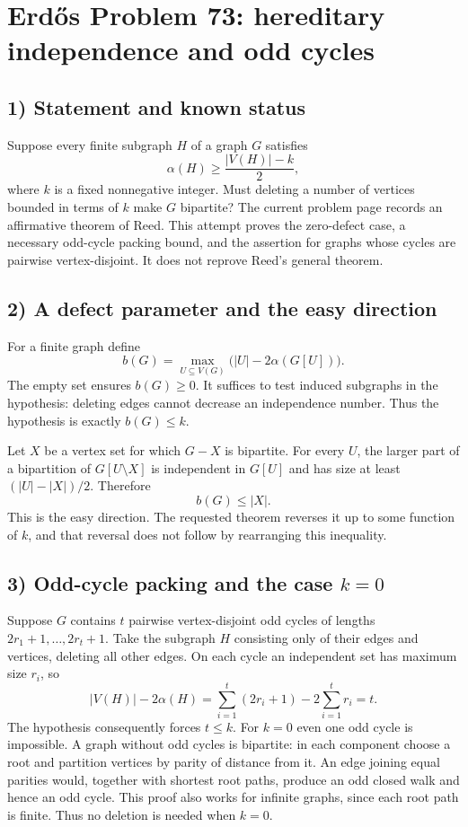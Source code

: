 \section{Erd\H{o}s Problem 73: hereditary independence and odd cycles}

\subsection{1) Statement and known status}
Suppose every finite subgraph $H$ of a graph $G$ satisfies
\[
 \alpha(H)\geq\frac{|V(H)|-k}{2},
\]
where $k$ is a fixed nonnegative integer. Must deleting a number of
vertices bounded in terms of $k$ make $G$ bipartite?
The current problem page records an affirmative theorem of Reed.
This attempt proves the zero-defect case, a necessary odd-cycle
packing bound, and the assertion for graphs whose cycles are
pairwise vertex-disjoint. It does not reprove Reed's general theorem.

\subsection{2) A defect parameter and the easy direction}
For a finite graph define
\[
 b(G)=\max_{U\subseteq V(G)}\bigl(|U|-2\alpha(G[U])\bigr).
\]
The empty set ensures $b(G)\geq0$. It suffices to test induced
subgraphs in the hypothesis: deleting edges cannot decrease an
independence number. Thus the hypothesis is exactly $b(G)\leq k$.

Let $X$ be a vertex set for which $G-X$ is bipartite. For every $U$,
the larger part of a bipartition of $G[U\setminus X]$ is independent
in $G[U]$ and has size at least $(|U|-|X|)/2$. Therefore
\[
 b(G)\leq |X|.
\]
This is the easy direction. The requested theorem reverses it up to
some function of $k$, and that reversal does not follow by rearranging
this inequality.

\subsection{3) Odd-cycle packing and the case $k=0$}
Suppose $G$ contains $t$ pairwise vertex-disjoint odd cycles of
lengths $2r_1+1,\ldots,2r_t+1$. Take the subgraph $H$ consisting
only of their edges and vertices, deleting all other edges. On each
cycle an independent set has maximum size $r_i$, so
\[
 |V(H)|-2\alpha(H)=
 \sum_{i=1}^t(2r_i+1)-2\sum_{i=1}^t r_i=t.
\]
The hypothesis consequently forces $t\leq k$.
For $k=0$ even one odd cycle is impossible. A graph without odd
cycles is bipartite: in each component choose a root and partition
vertices by parity of distance from it. An edge joining equal
parities would, together with shortest root paths, produce an odd
closed walk and hence an odd cycle. This proof also works for
infinite graphs, since each root path is finite. Thus no deletion
is needed when $k=0$.

